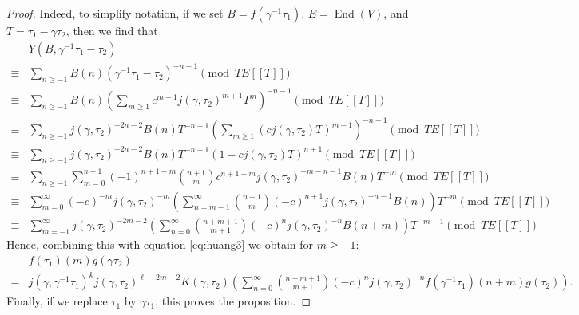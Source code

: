\documentclass[12pt]{amsart}
\theoremstyle{plain}
\theoremstyle{definition}
\theoremstyle{remark}
\DeclareMathOperator{\Endo}{End}
\providecommand{\pseries}[2]{#1[\![ #2 ]\!]}
\begin{document}
\begin{proof}
    Indeed, to simplify notation, if we set $B = f(\gamma^{-1}\tau_1)$, $E = \Endo(V)$, and $T=\tau_1-\gamma\tau_2$, then we find that
    \begin{align*}
    &Y(B,\gamma^{-1}\tau_1-\tau_2)\\
    \equiv& \sum_{n\geq -1} B(n) (\gamma^{-1}\tau_1-\tau_2)^{-n-1}\pmod{T\pseries{E}{T}}\\
    \equiv& \sum_{n\geq -1} B(n) \left(\sum_{m\geq 1} c^{m-1}j(\gamma,\tau_2)^{m+1}T^m\right)^{-n-1}\pmod{T\pseries{E}{T}}\\
    \equiv& \sum_{n\geq -1} j(\gamma,\tau_2)^{-2n-2}B(n)T^{-n-1} \left(\sum_{m\geq 1} \left(cj(\gamma,\tau_2)T\right)^{m-1}\right)^{-n-1}\pmod{T\pseries{E}{T}}\\
    \equiv& \sum_{n\geq -1} j(\gamma,\tau_2)^{-2n-2}B(n)T^{-n-1} \left(1-cj(\gamma,\tau_2)T\right)^{n+1}\pmod{T\pseries{E}{T}}\\
    \equiv& \sum_{n\geq -1}\sum_{m=0}^{n+1}(-1)^{n+1-m}\binom{n+1}{m}c^{n+1-m} j(\gamma,\tau_2)^{-m-n-1}B(n)T^{-m} \pmod{T\pseries{E}{T}}\\
    \equiv& \sum_{m=0}^\infty(-c)^{-m}j(\gamma,\tau_2)^{-m}\left(\sum_{n=m-1}^\infty\binom{n+1}{m}(-c)^{n+1} j(\gamma,\tau_2)^{-n-1}B(n)\right)T^{-m} \pmod{T\pseries{E}{T}}\\
    \equiv& \sum_{m=-1}^\infty j(\gamma,\tau_2)^{-2m-2}\left(\sum_{n=0}^\infty\binom{n+m+1}{m+1}(-c)^{n} j(\gamma,\tau_2)^{-n}B(n+m)\right)T^{-m-1} \pmod{T\pseries{E}{T}}
    \end{align*}
    Hence, combining this with equation \eqref{eq:huang3} we obtain for $m\geq -1$:
    \begin{align}
        \label{eq:prodtransformation}
        &f(\tau_1)(m)g(\gamma\tau_2)\\
        \nonumber =&j(\gamma,\gamma^{-1}\tau_1)^kj(\gamma,\tau_2)^{\ell-2m-2}K(\gamma,\tau_2)\left(\sum_{n=0}^{\infty}\binom{n+m+1}{m+1}(-c)^nj(\gamma,\tau_2)^{-n}f(\gamma^{-1}\tau_1)(n+m)g(\tau_2)\right).
    \end{align}
    Finally, if we replace $\tau_1$ by $\gamma \tau_1$, this proves the proposition.
    \end{proof}
\end{document}
